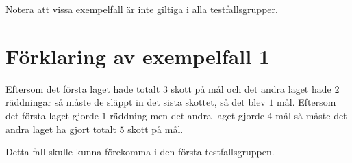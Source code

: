 Notera att vissa exempelfall är inte giltiga i alla testfallsgrupper.

\section*{Förklaring av exempelfall 1}
Eftersom det första laget hade totalt $3$ skott på mål och det andra laget hade $2$ räddningar så måste de släppt in det sista skottet, så det blev $1$ mål.
Eftersom det första laget gjorde $1$ räddning men det andra laget gjorde $4$ mål så måste det andra laget ha gjort totalt $5$ skott på mål.

Detta fall skulle kunna förekomma i den första testfallsgruppen.
